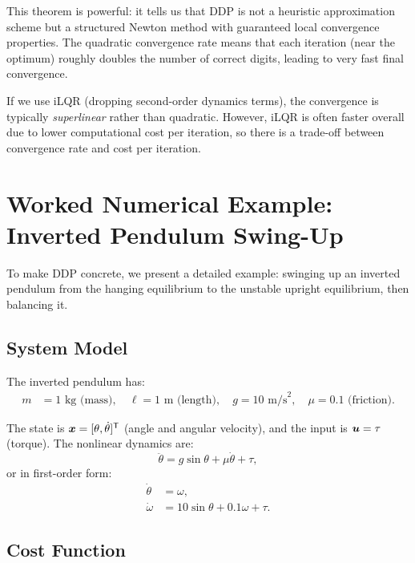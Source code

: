 This theorem is powerful: it tells us that DDP is not a heuristic approximation scheme but a structured Newton
method with guaranteed local convergence properties. The quadratic convergence rate means that each iteration
(near the optimum) roughly doubles the number of correct digits, leading to very fast final convergence.

\begin{remark}
If we use iLQR (dropping second-order dynamics terms), the convergence is typically \emph{superlinear} rather
than quadratic. However, iLQR is often faster overall due to lower computational cost per iteration, so there
is a trade-off between convergence rate and cost per iteration.
\end{remark}

\section{Worked Numerical Example: Inverted Pendulum Swing-Up}

To make DDP concrete, we present a detailed example: swinging up an inverted pendulum from the hanging equilibrium
to the unstable upright equilibrium, then balancing it.

\subsection{System Model}

The inverted pendulum has:
\begin{align}
m &= 1 \text{ kg (mass)}, \quad \ell = 1 \text{ m (length)}, \quad g = 10 \text{ m/s}^2, \quad \mu = 0.1 \text{ (friction)}. \label{eq:ch5:pendulum-params}
\end{align}

The state is $\bm{x} = [\theta, \dot\theta]^{\mathsf{T}}$ (angle and angular velocity), and the input is $\bm{u} = \tau$ (torque).
The nonlinear dynamics are:
\begin{equation}
\ddot\theta = g\sin\theta + \mu\dot\theta + \tau,
\label{eq:ch5:pendulum-dynamics}
\end{equation}
or in first-order form:
\begin{align}
\dot\theta &= \omega, \\
\dot\omega &= 10\sin\theta + 0.1\omega + \tau.
\label{eq:ch5:pendulum-first-order}
\end{align}

\subsection{Cost Function}

